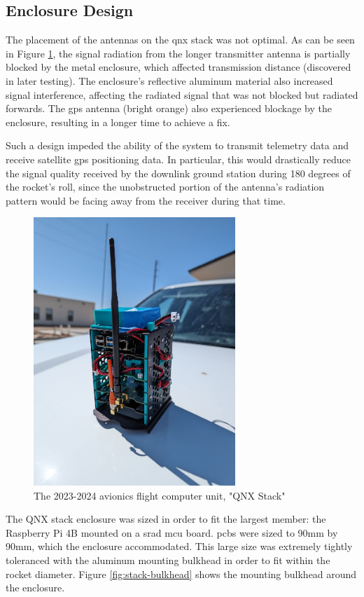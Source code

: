 \subsection{Enclosure Design}
The placement of the antennas on the \gls{qnx} stack was not optimal. As can be seen in Figure
\ref{fig:preflight-stack}, the signal radiation from the longer transmitter antenna is partially blocked by the metal
enclosure, which affected transmission distance (discovered in later testing). The enclosure's reflective aluminum
material also increased signal interference, affecting the radiated signal that was not blocked but radiated forwards.
The \gls{gps} antenna (bright orange) also experienced blockage by the enclosure, resulting in a longer time to achieve
a fix.

Such a design impeded the ability of the system to transmit telemetry data and receive satellite \gls{gps} positioning
data. In particular, this would drastically reduce the signal quality received by the downlink ground station during
180 degrees of the rocket's roll, since the unobstructed portion of the antenna's radiation pattern would be facing
away from the receiver during that time.

\begin{figure}[H]
    \center
    \includegraphics[width=3in]{assets/images/stack.jpg}
    \caption{The 2023-2024 avionics flight computer unit, "QNX Stack"}
    \label{fig:preflight-stack}
\end{figure}

The QNX stack enclosure was sized in order to fit the largest member: the Raspberry Pi 4B mounted on a \gls{srad}
\gls{mcu} board. \Glspl{pcb} were sized to 90mm by 90mm, which the enclosure accommodated. This large size was
extremely tightly toleranced with the aluminum mounting bulkhead in order to fit within the rocket diameter. Figure
\ref{fig:stack-bulkhead} shows the mounting bulkhead around the enclosure.

